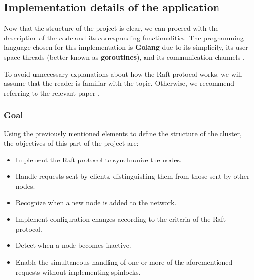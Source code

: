 \subsection{Implementation details of the application}
Now that the structure of the project is clear, we can proceed with the description 
of the code and its corresponding functionalities. The programming language chosen 
for this implementation is \textbf{Golang} due to its simplicity, its user-space threads 
(better known as \textbf{goroutines}), and its communication channels \cite{4}.

To avoid unnecessary explanations about how the Raft protocol works, we will assume 
that the reader is familiar with the topic. Otherwise, we recommend referring to 
the relevant paper \cite{1}.

\subsubsection{Goal}
Using the previously mentioned elements to define the structure of the cluster, 
the objectives of this part of the project are:
\begin{itemize}
  \item Implement the Raft protocol to synchronize the nodes.
  \item Handle requests sent by clients, distinguishing them from those sent by other nodes.
  \item Recognize when a new node is added to the network.
  \item Implement configuration changes according to the criteria of the Raft protocol.
  \item Detect when a node becomes inactive.
  \item Enable the simultaneous handling of one or more of the aforementioned requests without implementing spinlocks.
\end{itemize}

